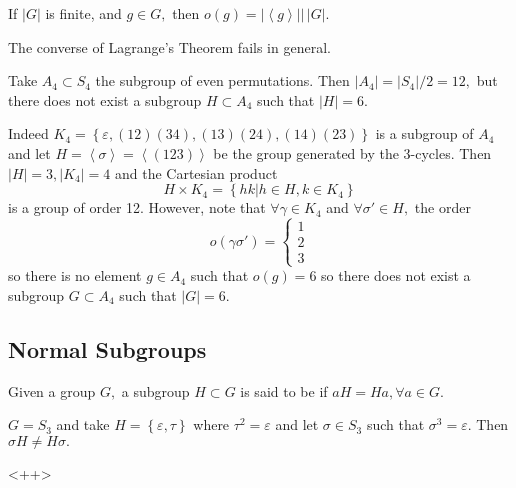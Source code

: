 \documentclass{article}
\begin{document}
\begin{corollary}
	If $|G|$ is finite, and $g\in G,$ then $o(g)=\left\lvert \left< g\right> \right\rvert\big \vert\, |G|.$
\end{corollary}

\begin{remark}
	The converse of Lagrange's Theorem fails in general. 
\end{remark}

\begin{example}
	Take $A_4\subset S_4$ the subgroup of even permutations. Then $|A_4|=|S_4|/2=12,$ but there does not exist a subgroup $H\subset A_4$ such that $|H|=6.$

	Indeed $K_4=\left\{ \varepsilon, (12)(34), (13)(24), (14)(23) \right\}$ is a subgroup of $A_4$ and let $H=\left< \sigma\right>=\left< (123)\right>$ be the group generated by the 3-cycles. Then $|H|=3, |K_4|=4$ and the Cartesian product \[H\times K_4=\left\{ hk|h\in H, k\in K_4 \right\}\] is a group of order 12. However, note that $\forall \gamma\in K_4$ and $\forall \sigma'\in H,$ the order \[o(\gamma\sigma')=\begin{cases}
			1 \\ 2 \\ 3
	\end{cases}\] so there is no element $g\in A_4$ such that $o(g)=6$ so there does not exist a subgroup $G\subset A_4$ such that $|G|=6.$
\end{example} 

\subsection{Normal Subgroups}
\begin{definition}
	Given a group $G,$ a subgroup $H\subset G$ is said to be  if $aH=Ha, \forall a\in G.$
\end{definition}

\begin{example}
	$G=S_3$ and take $H=\left\{ \varepsilon, \tau \right\}$ where $\tau^2=\varepsilon$ and let $\sigma\in S_3$ such that $\sigma^3=\varepsilon.$ Then $\sigma H\neq H\sigma.$
\end{example}<++>
\end{document}
